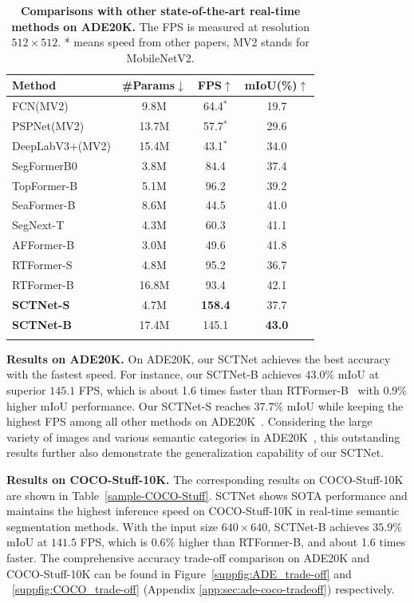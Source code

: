 \documentclass[letterpaper]{article} %
\begin{document}
\begin{table}[t]
  \centering
  \begin{tabular}{l|c|c|c}
    \Xhline{1pt}
    Method & \#Params$\downarrow$ &FPS$\uparrow$ &mIoU(\%)$\uparrow$\\
    \hline
    FCN(MV2)     &9.8M &64.4$^*$   &19.7\\
    PSPNet(MV2) &13.7M &57.7$^*$ &29.6 \\
    DeepLabV3+(MV2)  &15.4M &43.1$^*$  &34.0 \\
    SegFormerB0  &3.8M    &84.4  &37.4 \\
    TopFormer-B &5.1M &96.2    &39.2\\
    SeaFormer-B &8.6M &44.5   &41.0 \\
    SegNext-T &4.3M  &60.3   &41.1 \\
    AFFormer-B &3.0M  &49.6   &41.8 \\
    RTFormer-S  &4.8M &95.2  &36.7\\
    RTFormer-B &16.8M &93.4 &42.1 \\
    \hline
    \textbf{SCTNet-S} &4.7M &\textbf{158.4}  &37.7 \\
    \textbf{SCTNet-B} &17.4M &145.1  &\textbf{43.0}  \\
    \Xhline{1pt}
  \end{tabular}
  \caption{\textbf{Comparisons with other state-of-the-art real-time methods on ADE20K.} The FPS is measured at resolution $512\times512$. * means speed from other papers, MV2 stands for MobileNetV2.} 
  \label{sample-tableADE20K}
  \vspace{-10pt}
\end{table}

\noindent
{\bf Results on ADE20K.} On ADE20K\cite{zhou2017scene}, our SCTNet achieves the best accuracy with the fastest speed. For instance, our SCTNet-B achieves $43.0\%$ mIoU at superior $145.1$ FPS, which is about 1.6 times faster than RTFormer-B~\cite{wang2022rtformer} with 0.9\% higher mIoU performance. Our SCTNet-S reaches $37.7\%$ mIoU while keeping the highest FPS among all other methods on ADE20K~\cite{zhou2017scene}. Considering the large variety of images and various semantic categories in ADE20K~\cite{zhou2017scene}, this outstanding results further also demonstrate the generalization capability of our SCTNet.

\noindent
{\bf Results on COCO-Stuff-10K.} The corresponding results on COCO-Stuff-10K are shown in Table~\ref{sample-COCO-Stuff}. SCTNet shows SOTA performance and maintains the highest inference speed on COCO-Stuff-10K in real-time semantic segmentation methods. With the input size $640 \times 640$, SCTNet-B achieves  $35.9\%$ mIoU at $141.5$ FPS, which is $0.6\%$ higher than RTFormer-B, and about 1.6 times faster. The comprehensive accuracy trade-off comparison on ADE20K and COCO-Stuff-10K can be found in Figure~\ref{suppfig:ADE_trade-off} and ~\ref{suppfig:COCO_trade-off} (Appendix \ref{app:sec:ade-coco-tradeoff}) respectively.
\end{document}
